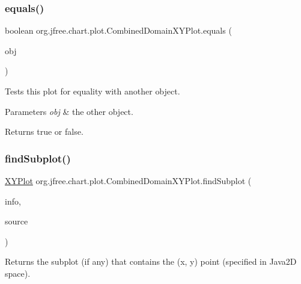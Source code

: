 \subsubsection{\texorpdfstring{equals()}{equals()}}
{\footnotesize\ttfamily boolean org.\+jfree.\+chart.\+plot.\+Combined\+Domain\+X\+Y\+Plot.\+equals (\begin{DoxyParamCaption}\item[{Object}]{obj }\end{DoxyParamCaption})}

Tests this plot for equality with another object.


\begin{DoxyParams}{Parameters}
{\em obj} & the other object.\\
\hline
\end{DoxyParams}
\begin{DoxyReturn}{Returns}
{\ttfamily true} or {\ttfamily false}. 
\end{DoxyReturn}
\mbox{\label{classorg_1_1jfree_1_1chart_1_1plot_1_1_combined_domain_x_y_plot_a82f1d9d7dd0e921f206dfbe9a672ccee}} 
\subsubsection{\texorpdfstring{find\+Subplot()}{findSubplot()}}
{\footnotesize\ttfamily \mbox{\hyperlink{classorg_1_1jfree_1_1chart_1_1plot_1_1_x_y_plot}{X\+Y\+Plot}} org.\+jfree.\+chart.\+plot.\+Combined\+Domain\+X\+Y\+Plot.\+find\+Subplot (\begin{DoxyParamCaption}\item[{\mbox{\hyperlink{classorg_1_1jfree_1_1chart_1_1plot_1_1_plot_rendering_info}{Plot\+Rendering\+Info}}}]{info,  }\item[{Point2D}]{source }\end{DoxyParamCaption})}

Returns the subplot (if any) that contains the (x, y) point (specified in Java2D space).


